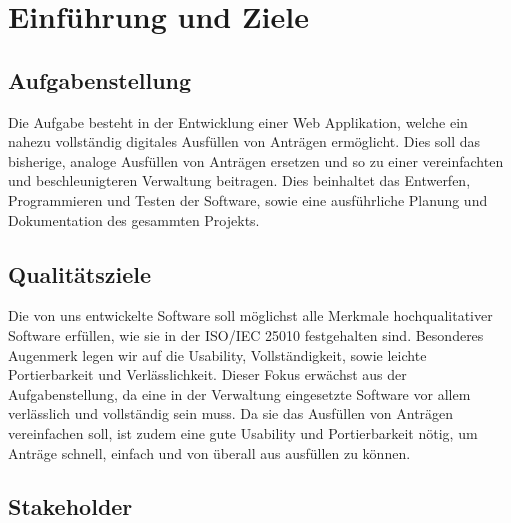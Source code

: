 \chapter{Einführung und Ziele}\label{ch:einfuhrung-und-ziele}

\section{Aufgabenstellung}\label{sec:aufgabenstellung}
Die Aufgabe besteht in der Entwicklung einer Web Applikation, welche ein nahezu vollständig digitales
Ausfüllen von Anträgen ermöglicht. Dies soll das bisherige, analoge Ausfüllen von Anträgen ersetzen und so zu einer vereinfachten und beschleunigteren Verwaltung beitragen. Dies beinhaltet das Entwerfen, Programmieren und Testen der 
Software, sowie eine ausführliche Planung und Dokumentation des gesammten Projekts.

\section{Qualitätsziele}\label{sec:qualitatsziele}
Die von uns entwickelte Software soll möglichst alle Merkmale hochqualitativer Software erfüllen, wie 
sie in der ISO/IEC 25010 festgehalten sind. Besonderes Augenmerk legen wir auf die Usability, 
Vollständigkeit, sowie leichte Portierbarkeit und Verlässlichkeit. Dieser Fokus erwächst aus der 
Aufgabenstellung, da eine in der Verwaltung eingesetzte Software vor allem verlässlich und vollständig 
sein muss. Da sie das Ausfüllen von Anträgen vereinfachen soll, ist zudem eine gute Usability und
Portierbarkeit nötig, um Anträge schnell, einfach und von überall aus ausfüllen zu können.
\section{Stakeholder}\label{sec:stakeholder}